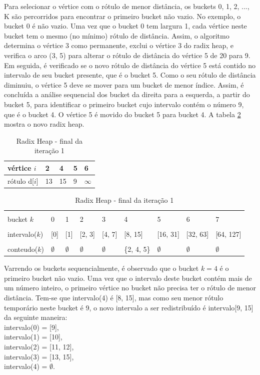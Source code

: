 Para selecionar o vértice com o rótulo de menor distância, os buckets 0, 1, 2, ..., K são percorridos para encontrar o
primeiro bucket não vazio. No exemplo, o bucket 0 é não vazio. Uma vez que o bucket 0 tem largura 1,
cada vértice neste bucket tem o mesmo (no mínimo) rótulo de distância. Assim, o algoritmo determina o vértice 3 como permanente,
exclui o vértice 3 do radix heap, e verifica o arco (3, 5) para alterar o rótulo de distância do vértice 5 de 20 para 9.
Em seguida, é verificado se o novo rótulo de distância do vértice 5 está contido no intervalo de seu bucket presente,
que é o bucket 5. Como o seu rótulo de distância diminuiu, o vértice 5 deve se mover para um bucket de menor índice.
Assim, é concluída a análise sequencial dos bucket da direita para a esquerda, a partir do bucket 5,
para identificar o primeiro bucket cujo intervalo contém o número 9, que é o bucket 4.
O vértice 5 é movido do bucket 5 para bucket 4. A tabela \ref{tab:secondradixheap} mostra o novo radix heap.

\begin{table}[htbp]
	\centering
	\begin{tabular}{l l l l l}
	\toprule
	vértice $i$ & 2 & 4 & 5 & 6\\
	\midrule
	rótulo d[$i$] & 13 & 15 & 9 & $\infty$ \\
	\bottomrule
	\end{tabular}
	
	\centering
	\begin{tabular}{l l l l l l l l l}
	\toprule
	\\bucket $k$ & 0 & 1 & 2 & 3 & 4 & 5 & 6 & 7\\
	\midrule
	\\intervalo($k$) & [0] & [1] & [2, 3] & [4, 7] & [8, 15] & [16, 31] & [32, 63] & [64, 127]\\
	\\conteudo($k$) & $\emptyset$ & $\emptyset$ & $\emptyset$ & $\emptyset$ & \{2, 4, 5\} & $\emptyset$ & $\emptyset$ & $\emptyset$\\
	\bottomrule
	\end{tabular}
\caption{Radix Heap - final da iteração 1}
 \label{tab:secondradixheap}
\end{table}
\FloatBarrier
Varrendo os buckets sequencialmente, é observado que o bucket $k = 4$ é o primeiro bucket não vazio.
Uma vez que o intervalo deste bucket contém mais de um número inteiro, o primeiro vértice no bucket não precisa ter
o rótulo de menor distância. Tem-se que intervalo(4) é [8, 15], mas como seu menor rótulo temporário neste bucket é 9,
o novo intervalo a ser redistribuído é intervalo[9, 15] da seguinte maneira:\\
intervalo(0) = [9],\\
intervalo(1) = [10],\\
intervalo(2) = [11, 12],\\
intervalo(3) = [13, 15],\\
intervalo(4) = $\emptyset$.

